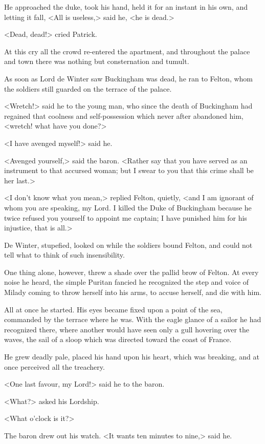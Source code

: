 He approached the duke, took his hand, held it for an instant in his own, and letting it fall, <All is useless,> said he, <he is dead.> 

<Dead, dead!> cried Patrick. 

At this cry all the crowd re-entered the apartment, and throughout the palace and town there was nothing but consternation and tumult. 

As soon as Lord de Winter saw Buckingham was dead, he ran to Felton, whom the soldiers still guarded on the terrace of the palace. 

<Wretch!> said he to the young man, who since the death of Buckingham had regained that coolness and self-possession which never after abandoned him, <wretch! what have you done?> 

<I have avenged myself!> said he. 

<Avenged yourself,> said the baron. <Rather say that you have served as an instrument to that accursed woman; but I swear to you that this crime shall be her last.> 

<I don't know what you mean,> replied Felton, quietly, <and I am ignorant of whom you are speaking, my Lord. I killed the Duke of Buckingham because he twice refused you yourself to appoint me captain; I have punished him for his injustice, that is all.> 

De Winter, stupefied, looked on while the soldiers bound Felton, and could not tell what to think of such insensibility. 

One thing alone, however, threw a shade over the pallid brow of Felton. At every noise he heard, the simple Puritan fancied he recognized the step and voice of Milady coming to throw herself into his arms, to accuse herself, and die with him. 

All at once he started. His eyes became fixed upon a point of the sea, commanded by the terrace where he was. With the eagle glance of a sailor he had recognized there, where another would have seen only a gull hovering over the waves, the sail of a sloop which was directed toward the coast of France. 

He grew deadly pale, placed his hand upon his heart, which was breaking, and at once perceived all the treachery. 

<One last favour, my Lord!> said he to the baron. 

<What?> asked his Lordship. 

<What o'clock is it?> 

The baron drew out his watch. <It wants ten minutes to nine,> said he. 

